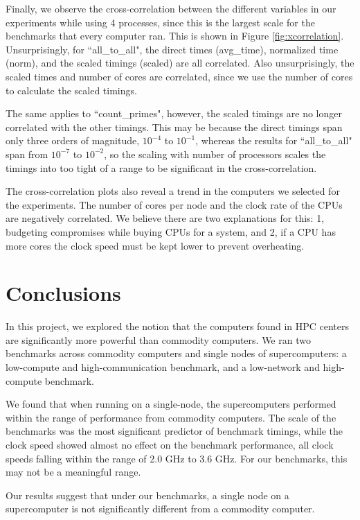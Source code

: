 \documentclass{article}
\begin{document}
Finally, we observe the cross-correlation between the different variables in our experiments while using 4 processes, since this is the largest scale for the benchmarks that every computer ran. This is shown in Figure \ref{fig:xcorrelation}.
Unsurprisingly, for ``all\_to\_all", the direct times (avg\_time), normalized time (norm), and the scaled timings (scaled) are all correlated. Also unsurprisingly, the scaled times and number of cores are correlated, since we use the number of cores to calculate the scaled timings.

The same applies to ``count\_primes", however, the scaled timings are no longer correlated with the other timings. This may be because the direct timings span only three orders of magnitude, $10^{-4}$ to $10^{-1}$, whereas the results for ``all\_to\_all" span from $10^{-7}$ to $10^{-2}$, so the scaling with number of processors scales the timings into too tight of a range to be significant in the cross-correlation.

The cross-correlation plots also reveal a trend in the computers we selected for the experiments. The number of cores per node and the clock rate of the CPUs are negatively correlated. We believe there are two explanations for this: 1, budgeting compromises while buying CPUs for a system, and 2, if a CPU has more cores the clock speed must be kept lower to prevent overheating.


\section{Conclusions}

In this project, we explored the notion that the computers found in HPC centers are significantly more powerful than commodity computers. We ran two benchmarks across commodity computers and single nodes of supercomputers: a low-compute and high-communication benchmark, and a low-network and high-compute benchmark.

We found that when running on a single-node, the supercomputers performed within the range of performance from commodity computers. The scale of the benchmarks was the most significant predictor of benchmark timings, while the clock speed showed almost no effect on the benchmark performance, all clock speeds falling within the range of 2.0 GHz to 3.6 GHz. For our benchmarks, this may not be a meaningful range.

Our results suggest that under our benchmarks, a single node on a supercomputer is not significantly different from a commodity computer.
\end{document}
